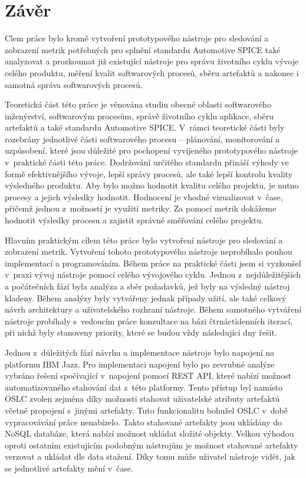\documentclass[czech,master]{diploma}
\begin{document}
\chapter{Závěr}
Clem práce bylo kromě vytvoření prototypového nástroje pro sledování a zobrazení metrik potřebných pro splnění standardu Automotive SPICE také analyzovat a prozkoumat již existující nástroje pro správu životního cyklu vývoje celého produktu, měření kvalit softwarových procesů, sběru artefaktů a nakonec i samotná správa softwarových procesů.

Teoretická část této práce je věnována studiu obecné oblasti softwarového inženýrství, softwarovým procesům, správě životního cyklu aplikace, sběru artefaktů a také standardu Automotive SPICE. V~rámci teoretické části byly rozebrány jednotlivé části softwarového procesu -- plánování, monitorování a uzpůsobení, které jsou důležité pro pochopení vyvíjeného prototypového nástroje v~praktické části této práce. Dodržování určitého standardu přináší výhody ve formě efektivnějšího vývoje, lepší správy procesů, ale také lepší kontrolu kvality výsledného produktu. Aby bylo možno hodnotit kvalitu celého projektu, je nutno procesy a jejich výsledky hodnotit. Hodnocení je vhodné vizualizovat v~čase, přičemž jednou z~možností je využití metriky. Za pomocí metrik dokážeme hodnotit výsledky procesu a zajistit správné směřování celého projektu.

Hlavním praktickým cílem této práce bylo vytvoření nástroje pro sledování a zobrazení metrik. Vytvoření tohoto prototypového nástroje neprobíhalo pouhou implementací a programováním.  Během práce na praktické části jsem si vyzkoušel v~praxi vývoj nástroje pomocí celého vývojového cyklu. Jednou z~nejdůležitějších a počátečních fází byla analýza a sběr požadavků, jež byly na výsledný nástroj kladeny. Během analýzy byly vytvářeny jednak případy užití, ale také celkový návrh architektury a uživatelského rozhraní nástroje. Během samotného vytváření nástroje probíhaly s~vedoucím práce konzultace na bázi čtrnáctidenních iterací, při nichž byly stanoveny priority, které se budou vždy následující dny řešit.

Jednou z~důležitých fází návrhu a implementace nástroje bylo napojení na platformu IBM Jazz. Pro implementaci napojení bylo po zevrubné analýze vybráno řešení spočívající v~napojení pomocí REST API, které nabízí možnost automatizovaného stahování dat z~této platformy. Tento přístup byl namísto OSLC zvolen zejména díky možnosti stahovat uživatelské atributy artefaktů včetně propojení s~jinými artefakty. Tuto funkcionalitu bohužel OSLC v~době vypracovávání práce nenabízelo. Takto stahované artefakty jsou ukládány do NoSQL databáze, která nabízí možnost ukládat složité objekty. Velkou výhodou oproti ostatním existujícím podobným nástrojům je možnost stahované artefakty verzovat a ukládat dle data stažení. Díky tomu může uživatel nástroje vidět, jak se jednotlivé artefakty mění v~čase.
\end{document}
